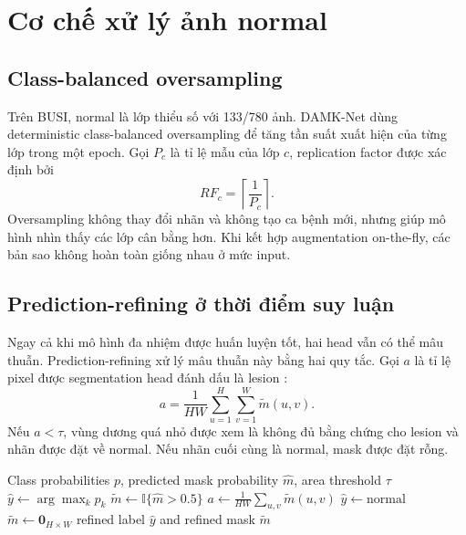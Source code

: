 \documentclass[12pt,a4paper,oneside]{report}
\newcommand{\modelname}{DAMK-Net}
\begin{document}
\section{Cơ chế xử lý ảnh normal}

\subsection{Class-balanced oversampling}

Trên BUSI, normal là lớp thiểu số với 133/780 ảnh. \modelname{} dùng deterministic class-balanced oversampling để tăng tần suất xuất hiện của từng lớp trong một epoch. Gọi $P_c$ là tỉ lệ mẫu của lớp $c$, replication factor được xác định bởi \citep{busi,aumente,damknet}
\[
RF_c=\left\lceil \frac{1}{P_c} \right\rceil.
\]
Oversampling không thay đổi nhãn và không tạo ca bệnh mới, nhưng giúp mô hình nhìn thấy các lớp cân bằng hơn. Khi kết hợp augmentation on-the-fly, các bản sao không hoàn toàn giống nhau ở mức input.

\subsection{Prediction-refining ở thời điểm suy luận}

Ngay cả khi mô hình đa nhiệm được huấn luyện tốt, hai head vẫn có thể mâu thuẫn. Prediction-refining xử lý mâu thuẫn này bằng hai quy tắc. Gọi $a$ là tỉ lệ pixel được segmentation head đánh dấu là lesion \citep{aumente,damknet}:
\[
a = \frac{1}{HW}\sum_{u=1}^{H}\sum_{v=1}^{W} \tilde{m}(u,v).
\]
Nếu $a<\tau$, vùng dương quá nhỏ được xem là không đủ bằng chứng cho lesion và nhãn được đặt về normal. Nếu nhãn cuối cùng là normal, mask được đặt rỗng.

\begin{algorithm}[H]
\caption{Prediction-refining cho đầu ra của \modelname{}}
\label{alg:refining}
\begin{algorithmic}[1]
\Require Class probabilities $p$, predicted mask probability $\hat{m}$, area threshold $\tau$
\State $\hat{y}\gets \arg\max_k p_k$
\State $\tilde{m}\gets \mathbb{I}\{\hat{m}>0.5\}$
\State $a\gets \frac{1}{HW}\sum_{u,v}\tilde{m}(u,v)$
  \State $\hat{y}\gets \text{normal}$
\EndIf
{}
  \State $\tilde{m}\gets \mathbf{0}_{H\times W}$
\EndIf
\State \Return refined label $\hat{y}$ and refined mask $\tilde{m}$
\end{algorithmic}
\end{algorithm}
\end{document}
